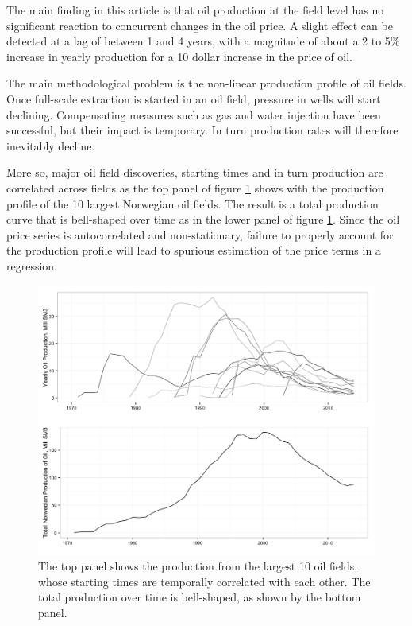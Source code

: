 \documentclass[11pt]{article}
\begin{document}
The main finding in this article is that oil production at the field level has no significant reaction to concurrent changes in the oil price.  A slight effect can be detected at a lag of between 1 and 4 years, with a magnitude of about a 2 to 5\% increase in yearly production for a 10 dollar increase in the price of oil.  


The main methodological problem is the non-linear production profile of oil fields.  Once full-scale extraction is started in an oil field, pressure in wells will start declining. Compensating measures such as gas and water injection have been successful, but their impact is temporary. In turn production rates will therefore inevitably decline.

More so, major oil field discoveries, starting times and in turn production are correlated across fields as the top panel of figure \ref{oil_decline} shows with the production profile of the 10 largest Norwegian oil fields.  The result is a total production curve that is bell-shaped over time as in the lower panel of figure \ref{oil_decline}.  Since the oil price series is autocorrelated and non-stationary, failure to properly account for the production profile will lead to spurious estimation of the price terms in a regression.

\begin{figure}
	\includegraphics[width=1\textwidth]{figures/oil_decline.png}
	\caption{The top panel shows the production from the largest 10 oil fields, whose starting times are temporally correlated with each other.  The total production over time is bell-shaped, as shown by the bottom panel.}
	\label{oil_decline}
\end{figure}
\end{document}
